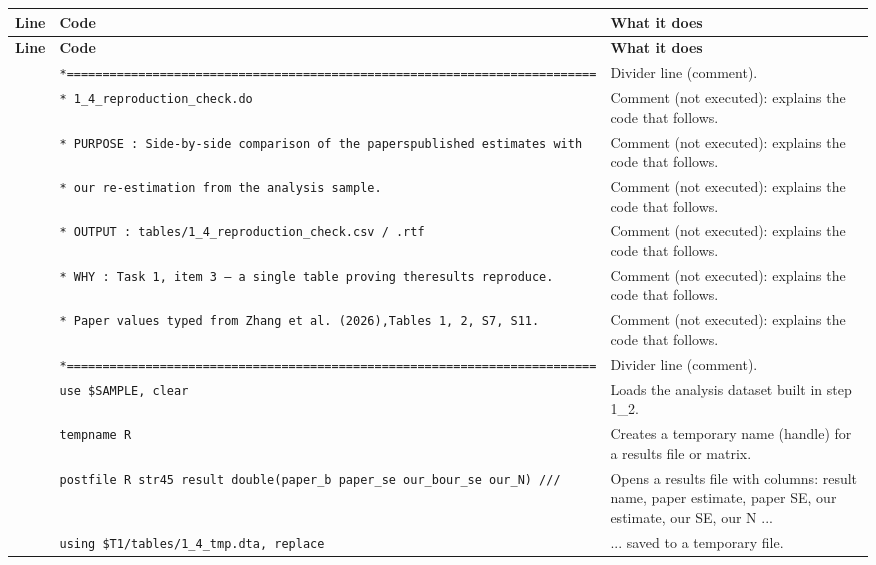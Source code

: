 \documentclass[10pt]{article}
\newcommand{\codetable}[1]{%
{\footnotesize
\begin{longtable}{>{\raggedleft\arraybackslash}p{0.55cm}>{\raggedright\arraybackslash}p{8.3cm}>{\raggedright\arraybackslash}p{8.0cm}}
\toprule \textbf{Line} & \textbf{Code} & \textbf{What it does}\\ \midrule \endfirsthead
\toprule \textbf{Line} & \textbf{Code} & \textbf{What it does}\\ \midrule \endhead
\bottomrule \endfoot
#1
\end{longtable}}}
\begin{document}
\codetable{1 & \texttt{*=========================================================\newline \hspace*{1em}=================} & Divider line (comment).\\
2 & \texttt{* 1\_4\_reproduction\_check.do} & Comment (not executed): explains the code that follows.\\
3 & \texttt{* PURPOSE : Side-{}by-{}side comparison of the paper\textquotesingle{}s\newline \hspace*{1em}published estimates with} & Comment (not executed): explains the code that follows.\\
4 & \texttt{*           our re-{}estimation from the analysis sample.} & Comment (not executed): explains the code that follows.\\
5 & \texttt{* OUTPUT  : tables/1\_4\_reproduction\_check.csv / .rtf} & Comment (not executed): explains the code that follows.\\
6 & \texttt{* WHY     : Task 1, item 3 — a single table proving the\newline \hspace*{1em}results reproduce.} & Comment (not executed): explains the code that follows.\\
7 & \texttt{*           Paper values typed from Zhang et al. (2026),\newline \hspace*{1em}Tables 1, 2, S7, S11.} & Comment (not executed): explains the code that follows.\\
8 & \texttt{*=========================================================\newline \hspace*{1em}=================} & Divider line (comment).\\
9 & \texttt{use \textquotedbl{}\$SAMPLE\textquotedbl{}, clear} & Loads the analysis dataset built in step 1\_2.\\
11 & \texttt{tempname R} & Creates a temporary name (handle) for a results file or matrix.\\
12 & \texttt{postfile \textasciigrave{}R\textquotesingle{} str45 result double(paper\_b paper\_se our\_b\newline \hspace*{1em}our\_se our\_N) ///} & Opens a results file with columns: result name, paper estimate, paper SE, our estimate, our SE, our N ...\\
13 & \texttt{\hspace*{2.0em}using \textquotedbl{}\$T1/tables/1\_4\_tmp.dta\textquotedbl{}, replace} & ... saved to a temporary file.\\
}
\end{document}
